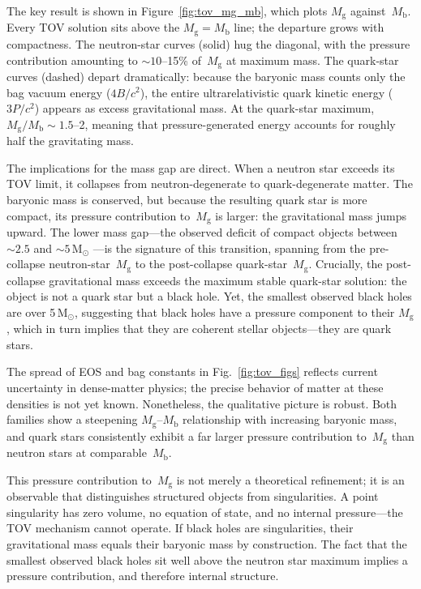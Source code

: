 \documentclass[manuscript,linenumbers]{aastex701}
\newcommand{\Msun}{\mathrm{M}_\odot}
\newcommand{\Mg}{M_{\mathrm{g}}}
\newcommand{\Mb}{M_{\mathrm{b}}}
\begin{document}
The key result is shown in Figure~\ref{fig:tov_mg_mb}, which plots
$\Mg$ against~$\Mb$.  Every TOV solution sits above the
$\Mg = \Mb$ line; the departure grows with compactness.  The
neutron-star curves (solid) hug the diagonal, with the pressure
contribution amounting to ${\sim}10$--15\% of~$\Mg$ at maximum mass.
The quark-star curves (dashed) depart dramatically: because the
baryonic mass counts only the bag vacuum energy ($4B/c^{2}$), the
entire ultrarelativistic quark kinetic energy ($3P/c^{2}$) appears as
excess gravitational mass.  At the quark-star maximum,
$\Mg/\Mb \sim 1.5$--2, meaning that pressure-generated energy
accounts for roughly half the gravitating mass.

The implications for the mass gap are direct.  When a neutron star
exceeds its TOV limit, it collapses from neutron-degenerate to
quark-degenerate matter.  The baryonic mass is conserved, but because
the resulting quark star is more compact, its pressure contribution
to~$\Mg$ is larger: the gravitational mass jumps upward.  The lower
mass gap---the observed deficit of compact objects between ${\sim}2.5$
and ${\sim}5\,\Msun$ \citep{Ozel2010,Farr2011}---is the
signature of this transition, spanning from the pre-collapse
neutron-star~$\Mg$ to the post-collapse quark-star~$\Mg$.
Crucially, the post-collapse gravitational mass exceeds the maximum
stable quark-star solution: the object is not a quark star but a black
hole. Yet, the smallest observed black holes are over
5\,$\Msun$, suggesting that black holes have a pressure
component to their $\Mg$, which in turn implies that they are coherent
stellar objects---they are quark stars.

The spread of EOS and bag constants in Fig.~\ref{fig:tov_figs}
reflects current uncertainty in dense-matter physics; the precise
behavior of matter at these densities is not yet known.
Nonetheless, the qualitative picture is robust.  Both families show
a steepening $\Mg$--$\Mb$ relationship with increasing baryonic
mass, and quark stars consistently exhibit a far larger pressure
contribution to~$\Mg$ than neutron stars at comparable~$\Mb$.

This pressure contribution to~$\Mg$ is not merely a theoretical
refinement; it is an observable that distinguishes structured objects
from singularities.  A point singularity has zero volume, no equation
of state, and no internal pressure---the TOV mechanism cannot operate.
If black holes are singularities, their gravitational mass equals
their baryonic mass by construction.  The fact that the smallest
observed black holes sit well above the neutron star maximum implies a
pressure contribution, and therefore internal structure.
\end{document}
